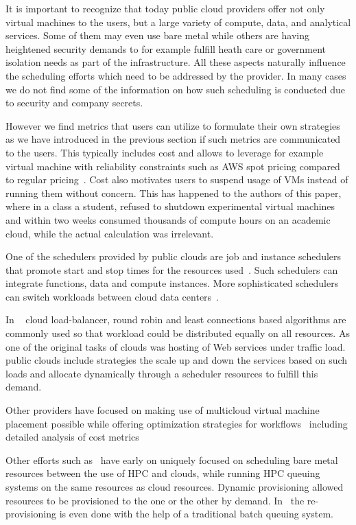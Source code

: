 \documentclass[final,5p,times,twocolumn]{elsarticle}
\begin{document}
It is important to recognize that today public cloud providers offer
not only virtual machines to the users, but a large variety of
compute, data, and analytical services. Some of them may even use bare
metal while others are having heightened security demands to for
example fulfill heath care or government isolation needs as part of
the infrastructure. All these aspects naturally influence the
scheduling efforts which need to be addressed by the provider. In many
cases we do not find some of the information on how such scheduling is
conducted due to security and company secrets.

However we find metrics that users can utilize to formulate their own
strategies as we have introduced in the previous section if such
metrics are communicated to the users. This typically includes cost
and allows to leverage for example virtual machine with reliability
constraints such as AWS spot pricing compared to regular
pricing~\cite{AmazonEC22015}.  Cost also motivates users to suspend
usage of VMs instead of running them without concern. This has
happened to the authors of this paper, where in a class a student,
refused to shutdown experimental virtual machines and within two weeks
consumed thousands of compute hours on an academic cloud, while the
actual calculation was irrelevant.

One of the schedulers provided by public clouds are job and instance
schedulers that promote start and stop times for the resources
used~\cite{AWSIns2019,AzureSch2019,Rackspace2016,GoogleAppEngine2018}. Such
schedulers can integrate functions, data and compute instances. More
sophisticated schedulers can switch workloads between cloud data
centers~\cite{MicrosoftAzure2014}.

In ~\cite{Rackspace2016} cloud load-balancer, round robin and least
connections based algorithms are commonly used so that workload could
be distributed equally on all resources.  As one of the original tasks
of clouds was hosting of Web services under traffic load. public
clouds include strategies the scale up and down the services based on
such loads and allocate dynamically through a scheduler resources to
fulfill this demand.

Other providers have focused on making use of multicloud virtual
machine placement possible while offering optimization strategies for
workflows~\cite{CloudSigma2016} including detailed analysis of cost
metrics \cite{Cloudmetrics2019}

Other efforts such as~\cite{las12fg-bookchapter,fox2013futuregrid}
have early on uniquely focused on scheduling bare metal resources
between the use of HPC and clouds, while running HPC queuing systems
on the same resources as cloud resources. Dynamic provisioning allowed
resources to be provisioned to the one or the other by
demand. In~\cite{las-comet} the re-provisioning is even done with the
help of a traditional batch queuing system.
\end{document}
